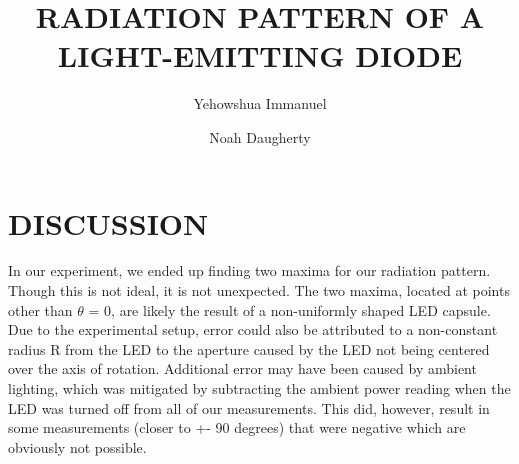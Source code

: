 \documentclass[10pt,a4paper]{article}
\title{RADIATION PATTERN OF A LIGHT-EMITTING DIODE}
\author{Yehowshua Immanuel \and Noah Daugherty}
\begin{document}
\maketitle
\tableofcontents
\newpage






\section{DISCUSSION}
In our experiment, we ended up finding two maxima for our radiation pattern. Though this is not ideal, it is not unexpected. The two maxima, located at points other than $\theta$ = 0, are likely the result of a non-uniformly shaped LED capsule. Due to the experimental setup, error could also be attributed to a non-constant radius R from the LED to the aperture caused by the LED not being centered over the axis of rotation. Additional error may have been caused by ambient lighting, which was mitigated by subtracting the ambient power reading when the LED was turned off from all of our measurements. This did, however, result in some measurements (closer to +- 90 degrees) that were negative which are obviously not possible. 

\newpage

\end{document}
